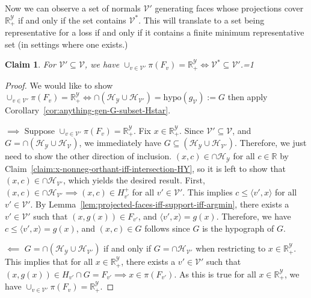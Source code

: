 \documentclass[11pt]{article}
\newcommand{\Comments}{1}
\newcommand{\mynote}[2]{\ifnum\Comments=1\textcolor{#1}{#2}\fi}
\newcommand{\mytodo}[2]{\ifnum\Comments=1%
  \todo[linecolor=#1!80!black,backgroundcolor=#1,bordercolor=#1!80!black]{#2}\fi}
\newcommand{\raf}[1]{\mynote{darkgreen}{[RF: #1]}}
\newcommand{\btw}[1]{\mytodo{gray!20!white}{BTW: #1}}%
\newcommand{\reals}{\mathbb{R}}
\renewcommand{\H}{\mathcal{H}}
\newcommand{\V}{\mathcal{V}}
\newcommand{\Y}{\mathcal{Y}}
\newcommand{\inprod}[2]{\langle #1, #2 \rangle}%
\newcommand{\relint}{\mathrm{relint}}
\newcommand{\hyp}{\mathrm{hypo}}
\newtheorem{claim}{Claim}
\begin{document}
Now we can observe a set of normals $\V'$ generating faces whose projections cover $\reals^\Y_+$ if and only if the set contains $\V^*$.
This will translate to a set being representative for a loss if and only if it contains a finite minimum representative set (in settings where one exists.)
\begin{claim}\label{claim:Vprime-projected-faces-cover-iff-Vstar-subset-Vprime}
	For $\V' \subseteq \V$, we have
	$\cup_{v\in\V'} \pi(F_v) = \reals^\Y_+ \iff \V^* \subseteq \V'$.\btw{Will get us to REP $\iff$ $\V^* \subseteq L(R')$ (3).}
\end{claim}
\begin{proof}
	We would like to show
	$\cup_{v\in\V'} \pi(F_v) = \reals^\Y_+ \iff \cap(\H_\Y \cup \H_{\V'}) = \hyp(g_\V) := G$ then apply Corollary~\ref{cor:anything-gen-G-subset-Hstar}.
	
	
	
	$\implies$ 
	Suppose $\cup_{v\in\V'} \pi(F_v) = \reals^\Y_+$.
	Fix $x \in \reals^\Y_+$.
	Since $\V' \subseteq \V$, and $G = \cap (\H_\Y \cup \H_\V)$, we immediately have $G \subseteq (\H_\Y \cup \H_{\V'})$.
	Therefore, we just need to show the other direction of inclusion.
	$(x,c) \in \cap \H_\Y$ for all $c \in \reals$ by Claim~\ref{claim:x-nonneg-orthant-iff-intersection-HY}, so it is left to show that $(x,c) \in \cap \H_{\V'}$, which yields the desired result.
	First, $(x,c) \in \cap \H_{\V'} \implies (x,c) \in H^+_{v'}$ for all $v' \in \V'$.
	This implies $c \leq \inprod{v'}{x}$ for all $v' \in \V'$.
	By Lemma~\ref{lem:projected-faces-iff-support-iff-argmin}, there exists a $v' \in \V'$ such that $(x,g(x)) \in F_{v'}$, and $\inprod{v'}{x} = g(x)$.
	Therefore, we have $c \leq \inprod{v'}{x} = g(x)$, and $(x,c) \in G$ follows since $G$ is the hypograph of $G$.
	
	
	
	$\impliedby$
	$G = \cap (\H_\Y \cup \H_{\V'})$ if and only if $G = \cap \H_{\V'}$ when restricting to $x \in \reals_+^\Y$.
	This implies that for all $x \in \reals_+^\Y$, there exists a $v' \in \V'$ such that $(x,g(x)) \in H_{v'} \cap G = F_{v'} \implies x \in \pi(F_{v'})$.
	As this is true for all $x \in \reals_+^\Y$, we have $\cup_{v \in \V'} \pi(F_{v}) = \reals_+^\Y$.
	
\end{proof}
\end{document}
